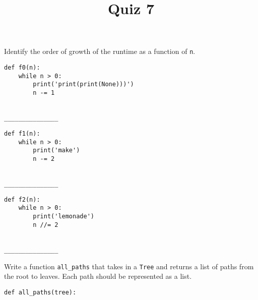 \documentclass[twoside]{article}
\title{\sc Quiz 7 \solution{Solutions}}
\begin{document}
\maketitle

\begin{enumerate}

Identify the order of growth of the runtime as a function of \lstinline{n}.
\vspace{0.1in}

\begin{lstlisting}
def f0(n):
    while n > 0:
        print('print(print(None)))')
        n -= 1
\end{lstlisting}
~\\
\lstinline{_______________}

\begin{lstlisting}
def f1(n):
    while n > 0:
        print('make')
        n -= 2
\end{lstlisting}
~\\
\lstinline{_______________}

\begin{lstlisting}
def f2(n):
    while n > 0:
        print('lemonade')
        n //= 2
\end{lstlisting}
~\\
\lstinline{_______________}

\newpage


Write a function \lstinline{all_paths} that takes in a \lstinline{Tree} and returns a list of paths from the root to leaves. Each path should be represented as a list.

\begin{lstlisting}
def all_paths(tree):
\end{lstlisting}

\end{enumerate}
\end{document}
